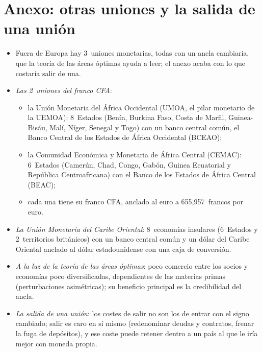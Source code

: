 \documentclass[11pt]{article}
\begin{document}
\section{Anexo: otras uniones y la salida de una unión}\label{anexo:otras-uniones}

\begin{itemize}
\item Fuera de Europa hay 3~uniones monetarias, todas con un ancla cambiaria, que la teoría de las áreas óptimas ayuda a leer; el anexo acaba con lo que costaría salir de una.
\item \emph{Las 2~uniones del franco CFA}:
  \begin{itemize}
  \item la Unión Monetaria del África Occidental (UMOA, el pilar monetario de la UEMOA): 8~Estados (Benín, Burkina Faso, Costa de Marfil, Guinea-Bisáu, Malí, Níger, Senegal y Togo) con un banco central común, el Banco Central de los Estados de África Occidental (BCEAO)\nocite{BCEAO2026Presentacion};
  \item la Comunidad Económica y Monetaria de África Central (CEMAC): 6~Estados (Camerún, Chad, Congo, Gabón, Guinea Ecuatorial y República Centroafricana) con el Banco de los Estados de África Central (BEAC)\nocite{BEAC2026Presentacion};
  \item cada una tiene su franco CFA, anclado al euro a 655,957~francos por euro\nocite{BCEAO2026Presentacion,BEAC2026Presentacion,FMI2024AREAER2023}.
  \end{itemize}
\item \emph{La Unión Monetaria del Caribe Oriental}: 8~economías insulares (6~Estados y 2~territorios británicos) con un banco central común y un dólar del Caribe Oriental anclado al dólar estadounidense con una caja de conversión\nocite{FMI2024AREAER2023}.
\item \emph{A la luz de la teoría de las áreas óptimas}: poco comercio entre los socios y economías poco diversificadas, dependientes de las materias primas (perturbaciones asimétricas); su beneficio principal es la credibilidad del ancla\nocite{DeGrauwe2022Economics}.
\item \emph{La salida de una unión}: los costes de salir no son los de entrar con el signo cambiado; salir es caro en sí mismo (redenominar deudas y contratos, frenar la fuga de depósitos), y ese coste puede retener dentro a un país al que le iría mejor con moneda propia\nocite{DeGrauwe2022Economics}.
  \begin{itemize}

\end{itemize}
\end{itemize}
\end{document}
